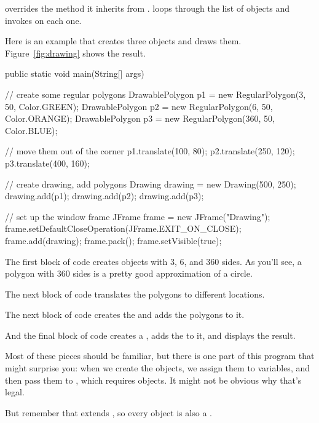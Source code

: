  overrides the  method it inherits from .
 loops through the list of  objects and invokes  on each one.

Here is an example that creates three  objects and draws them.
Figure~\ref{fig:drawing} shows the result.

\begin{code}
public static void main(String[] args) {

    // create some regular polygons
    DrawablePolygon p1 = new RegularPolygon(3, 50, Color.GREEN);
    DrawablePolygon p2 = new RegularPolygon(6, 50, Color.ORANGE);
    DrawablePolygon p3 = new RegularPolygon(360, 50, Color.BLUE);

    // move them out of the corner
    p1.translate(100, 80);
    p2.translate(250, 120);
    p3.translate(400, 160);

    // create drawing, add polygons
    Drawing drawing = new Drawing(500, 250);
    drawing.add(p1);
    drawing.add(p2);
    drawing.add(p3);

    // set up the window frame
    JFrame frame = new JFrame("Drawing");
    frame.setDefaultCloseOperation(JFrame.EXIT_ON_CLOSE);
    frame.add(drawing);
    frame.pack();
    frame.setVisible(true);
}
\end{code}

The first block of code creates  objects with 3, 6, and 360 sides.
As you'll see, a polygon with 360 sides is a pretty good approximation of a circle.

The next block of code translates the polygons to different locations.

The next block of code creates the  and adds the polygons to it.

And the final block of code creates a , adds the  to it, and displays the result.

Most of these pieces should be familiar, but there is one part of this program that might surprise you: when we create the  objects, we assign them to  variables, and then pass them to , which requires  objects.
It might not be obvious why that's legal.


But remember that  extends , so every  object is also a .

